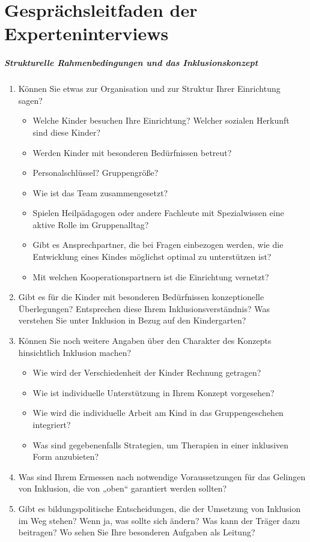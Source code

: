 \chapter{Gesprächsleitfaden der Experteninterviews}\label{Interviewleitfaden}
\paragraph{Strukturelle Rahmenbedingungen und das Inklusionskonzept}
\begin{enumerate}
\item Können Sie etwas zur Organisation und zur Struktur Ihrer Einrichtung sagen?
\begin{itemize}
\item Welche Kinder besuchen Ihre Einrichtung? Welcher sozialen Herkunft sind diese Kinder? 
\item Werden Kinder mit besonderen Bedürfnissen betreut?
\item Personalschlüssel? Gruppengröße?
\item Wie ist das Team zusammengesetzt?
\item Spielen Heilpädagogen oder andere Fachleute mit Spezialwissen eine aktive Rolle im Gruppenalltag?
\item Gibt es Ansprechpartner, die bei Fragen einbezogen werden, wie die Entwicklung eines Kindes möglichst optimal zu unterstützen ist? 
\item Mit welchen Kooperationspartnern ist die Einrichtung vernetzt?
\end{itemize}
\item Gibt es für die Kinder mit besonderen Bedürfnissen konzeptionelle Überlegungen? Entsprechen diese Ihrem Inklusionsverständnis?
Was verstehen Sie unter Inklusion in Bezug auf den Kindergarten? 
\item Können Sie noch weitere Angaben über den Charakter des Konzepts hinsichtlich Inklusion machen?
\begin{itemize}
\item Wie wird der Verschiedenheit der Kinder Rechnung getragen?
\item Wie ist individuelle Unterstützung in Ihrem Konzept vorgesehen?
\item Wie wird die individuelle Arbeit am Kind in das Gruppengeschehen integriert?
\item Was sind gegebenenfalls Strategien, um Therapien in einer inklusiven Form anzubieten?
\end{itemize}
\item Was sind Ihrem Ermessen nach notwendige Voraussetzungen für das Gelingen von Inklusion, die von „oben“ garantiert werden sollten? 
\item Gibt es bildungspolitische Entscheidungen, die der Umsetzung von Inklusion im Weg stehen? 
Wenn ja, was sollte sich ändern? 
Was kann der Träger dazu beitragen? 
Wo sehen Sie Ihre besonderen Aufgaben als Leitung?
\end{enumerate}

